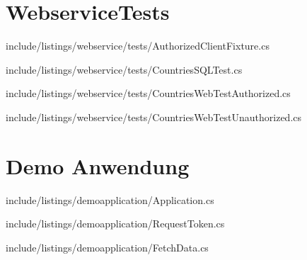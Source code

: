 		\pagebreak


	\section{WebserviceTests}\label{sec:webservicetests}

		
		{include/listings/webservice/tests/AuthorizedClientFixture.cs}

		\pagebreak

		
		{include/listings/webservice/tests/CountriesSQLTest.cs}

		\pagebreak

		
		{include/listings/webservice/tests/CountriesWebTestAuthorized.cs}

		\pagebreak

		
		{include/listings/webservice/tests/CountriesWebTestUnauthorized.cs}

		\pagebreak


	\section{Demo Anwendung}\label{sec:demo-anwendung}

		
		{include/listings/demoapplication/Application.cs}

		\pagebreak

		
		{include/listings/demoapplication/RequestToken.cs}

		\pagebreak

		
		{include/listings/demoapplication/FetchData.cs}